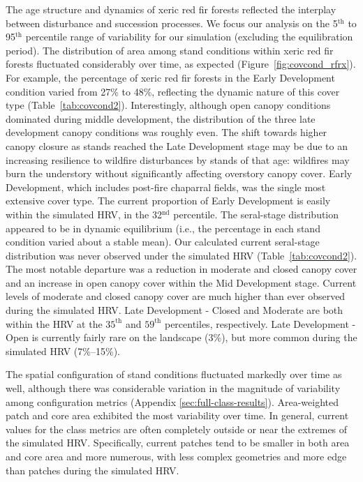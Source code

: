 The age structure and dynamics of xeric red fir forests reflected the interplay between disturbance and succession processes. We focus our analysis on the 5$^{\text{th}}$ to 95$^{\text{th}}$ percentile range of variability for our simulation (excluding the equilibration period). %
%
The distribution of area among stand conditions within xeric red fir forests fluctuated considerably over time, as expected (Figure~\ref{fig:covcond_rfrx}). For example, the percentage of xeric red fir forests in the Early Development condition varied from 27\% to 48\%, reflecting the dynamic nature of this cover type (Table~\ref{tab:covcond2}). Interestingly, although open canopy conditions dominated during middle development, the distribution of the three late development canopy conditions was roughly even. The shift towards higher canopy closure as stands reached the Late Development stage may be due to an increasing resilience to wildfire disturbances by stands of that age: wildfires may burn the understory without significantly affecting overstory canopy cover. Early Development, which includes post-fire chaparral fields, was the single most extensive cover type. The current proportion of Early Development is easily within the simulated HRV, in the 32$^{\text{nd}}$ percentile. %
%
The seral-stage distribution appeared to be in dynamic equilibrium (i.e., the percentage in each stand condition varied about a stable mean). Our calculated current seral-stage distribution was never observed under the simulated HRV (Table~\ref{tab:covcond2}). The most notable departure was a reduction in moderate and closed canopy cover and an increase in open canopy cover within the Mid Development stage. Current levels of moderate and closed canopy cover are much higher than ever observed during the simulated HRV. Late Development - Closed and Moderate are both within the HRV at the $35^{\text{th}}$ and $59^{\text{th}}$ percentiles, respectively. Late Development - Open is currently fairly rare on the landscape (3\%), but more common during the simulated HRV (7\%--15\%). 

The spatial configuration of stand conditions fluctuated markedly over time as well, although there was considerable variation in the magnitude of variability among configuration metrics (Appendix \ref{sec:full-class-results}). Area-weighted patch and core area exhibited the most variability over time. In general, current values for the class metrics are often completely outside or near the extremes of the simulated HRV. Specifically, current patches tend to be smaller in both area and core area and more numerous, with less complex geometries and more edge than patches during the simulated HRV.

